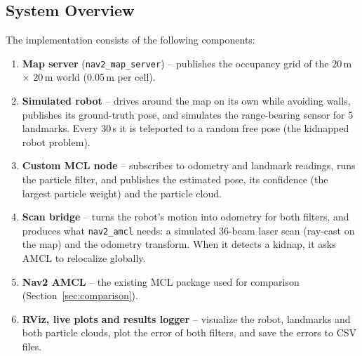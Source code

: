 \documentclass[12pt, a4paper]{article}
\begin{document}
\subsection{System Overview}
The implementation consists of the following components:
\begin{enumerate}[nosep]
  \item \textbf{Map server} (\texttt{nav2\_map\_server}) -- publishes the occupancy grid of the 20\,m \(\times\) 20\,m world (0.05\,m per cell).
  \item \textbf{Simulated robot} -- drives around the map on its own while avoiding walls, publishes its ground-truth pose, and simulates the range-bearing sensor for 5 landmarks.  Every 30\,s it is teleported to a random free pose (the kidnapped robot problem).
  \item \textbf{Custom MCL node} -- subscribes to odometry and landmark readings, runs the particle filter, and publishes the estimated pose, its confidence (the largest particle weight) and the particle cloud.
  \item \textbf{Scan bridge} -- turns the robot's motion into odometry for both filters, and produces what \texttt{nav2\_amcl} needs: a simulated 36-beam laser scan (ray-cast on the map) and the odometry transform.  When it detects a kidnap, it asks AMCL to relocalize globally.
  \item \textbf{Nav2 AMCL} -- the existing MCL package used for comparison (Section~\ref{sec:comparison}).
  \item \textbf{RViz, live plots and results logger} -- visualize the robot, landmarks and both particle clouds, plot the error of both filters, and save the errors to CSV files.
\end{enumerate}
\end{document}
